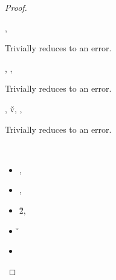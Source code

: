 \begin{lemma}
\begin{proof}
\begin{case}[B-DefMethod]
\begin{itemize}
\begin{subcase}[T-DefMethod]
      \end{subcase}

  \end{itemize}
\end{case}

      \begin{case}[BE-DefMethod1]
        \opsem {\openv{}}
               {}
               {\errorval{\v{}}},
        \opsem {\openv{}}
                  {\e{}}
                {\errorval{\v{}}}

                Trivially reduces to an error.

      \end{case}
      \begin{case}[BE-DefMethod2]
        \opsem {\openv{}}
         {}
         { {\disptable{}}},
  \opsem {\openv{}}
         {}
         {\errorval{\v{}}},
        \opsem {\openv{}}
                  {\e{}}
                {\errorval{\v{}}}

                Trivially reduces to an error.
      \end{case}
      \begin{case}[BE-DefMethod3]
        \opsem {\openv{}}
         {}
         { {\disptable{}}},
  \opsem {\openv{}}
         {}
         {\v{v}},
  \opsem {\openv{}}
         {}
         {\errorval{\v{}}},
        \opsem {\openv{}}
                  {\e{}}
                {\errorval{\v{}}}

                Trivially reduces to an error.

      \end{case}

\begin{case}[B-BetaClosure]
  \ 

  \begin{itemize}
    \item
  \opsem{\openv{}}{\e{}}{\v{}},
    \item
  \opsem {\openv{}}
         {}
         { {\abs {\x{}} {\s{}} {}}},
    \item
  \opsem {\openv{}}
         {}
         {\v{2}},
    \item
         {}
         {\v{}}
     \end{itemize}


\begin{itemize}
  \item[]
\begin{subcase}[T-App]
  \ 


\end{subcase}
\end{itemize}
\end{case}
\end{proof}
\end{lemma}
